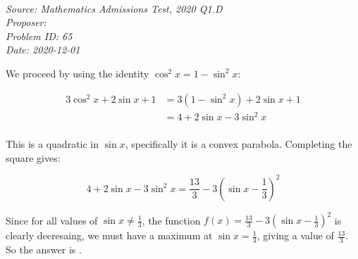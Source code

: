 \SSbreak\\
\emph{Source: Mathematics Admissions Test, 2020 Q1.D}\\
\emph{Proposer: \Pss}\\
\emph{Problem ID: 65}\\
\emph{Date: 2020-12-01}\\
\SSbreak

\bigskip

\begin{solution}\hfil\medskip
    
    We proceed by using the identity \(\cos^2x=1-\sin^2x\):

    \begin{align*}
        3\cos^2x+2\sin x+1&=3(1-\sin^2x)+2\sin x+1\\
        &=4+2\sin x-3\sin^2x\\
    \end{align*}

    This is a quadratic in \(\sin x\), specifically it is a convex parabola. Completing the square gives:

    \begin{equation*}
        4+2\sin x-3\sin^2x=\frac{13}{3}-3\left(\sin x-\frac{1}{3} \right)^2
    \end{equation*}

    Since for all values of \(\sin x\ne\frac{1}{3}\), the function \(f(x)=\frac{13}{3}-3\left(\sin x-\frac{1}{3}\right)^2\) is clearly decresaing, we must have a maximum at \(\sin x=\frac{1}{3}\), giving a value of \(\frac{13}{3}\). So the answer is .

\end{solution}\bigskip

